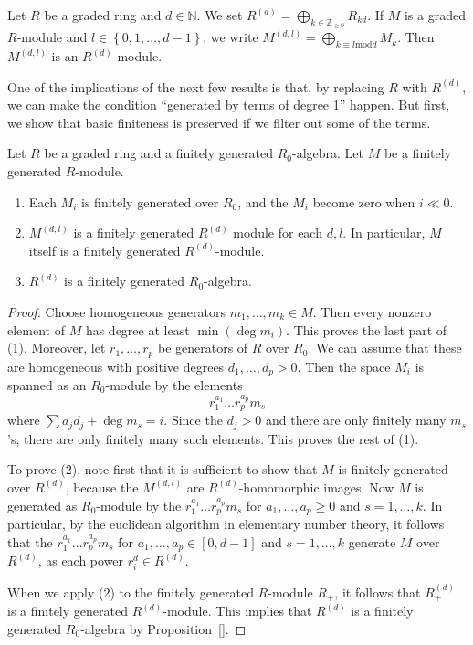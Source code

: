 \begin{definition} 
Let $R$ be a graded ring and $d \in \mathbb{N}$. We set $R^{(d)} = \bigoplus_{k
\in \mathbb{Z}_{\geq 0}} R_{kd}$.  If $M$ is a graded $R$-module and $l \in
\left\{0, 1, \dots, d-1\right\}$, we write $M^{(d,l)} = \bigoplus_{k \equiv l
\mathrm{mod} d} M_k$. Then $M^{(d,l)}$ is an $R^{(d)}$-module. 
\end{definition} 

One of the implications of the next few results is that, by replacing $R$ with
$R^{(d)}$, we can make the condition ``generated by terms of degree 1'' happen.
But first, we show that basic finiteness is preserved if we filter out some of
the terms.

\begin{proposition} \label{duple preserves finiteness}
Let $R$ be a graded ring and a finitely generated $R_0$-algebra. Let $M$ be a
finitely generated $R$-module.
\begin{enumerate}
\item Each $M_i$ is finitely generated over $R_0$, and the $M_i$ become zero when $i \ll
0$.
\item  $M^{(d,l)}$ is a finitely generated $R^{(d)}$ module for each $d,l$. In
particular, $M$ itself is a finitely generated $R^{(d)}$-module.
\item $R^{(d)}$ is a finitely generated $R_0$-algebra.
\end{enumerate}
\end{proposition} 
\begin{proof} 
Choose homogeneous generators $m_1, \dots, m_k \in M$. Then every nonzero
element of $M$ has degree at least $\min(\deg m_i)$.  This proves the
last part of (1). Moreover, let $r_1, \dots, r_p$ be generators of $R$ over
$R_0$.
We can assume that these are homogeneous with positive degrees $d_1, \dots, d_p>0$.
Then the space $M_i$ is spanned as an $R_0$-module by the elements
\[  r_1^{a_1} \dots r_p^{a_p} m_s  \]
where $\sum a_j d_j + \deg m_s = i$.  Since the $d_j>0$ and there are only
finitely many $m_s$'s, there are only finitely many such elements. This proves
the rest of (1).

To prove (2), note first that it is sufficient to show that $M$ is finitely
generated over $R^{(d)}$, because the $M^{(d,l)}$ are $R^{(d)}$-homomorphic
images.
Now $M$ is generated as $R_0$-module by the $r_1^{a_1} \dots r_p^{a_p} m_s $
for $a_1, \dots, a_p \geq 0$ and $s = 1, \dots,  k$.
In particular, by the euclidean algorithm in elementary number theory, it
follows that the 
$r_1^{a_1} \dots r_p^{a_p} m_s $
for $a_1, \dots, a_p \in [0, d-1]$ and $s = 1, \dots,  k$ generate $M$ over
$R^{(d)}$, as each power $r_i^{d} \in R^{(d)}$.

When we apply (2) to the finitely generated $R$-module $R_+$, it follows that $R^{(d)}_+$ is a finitely generated
$R^{(d)}$-module. This implies that $R^{(d)}$ is a finitely generated
$R_0$-algebra by Proposition~\ref{}.
\end{proof}

